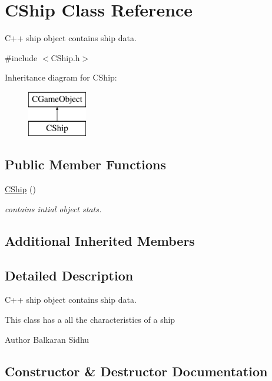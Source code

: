 \hypertarget{class_c_ship}{}\section{C\+Ship Class Reference}
\label{class_c_ship}


C++ ship object contains ship data.  




{\ttfamily \#include $<$C\+Ship.\+h$>$}

Inheritance diagram for C\+Ship\+:\begin{figure}[H]
\begin{center}
\leavevmode
\includegraphics[height=2.000000cm]{class_c_ship}
\end{center}
\end{figure}
\subsection*{Public Member Functions}
\begin{DoxyCompactItemize}
\item 
\hyperlink{class_c_ship_ab360264b9bcbcd4b733a8b64cb8f7529}{C\+Ship} ()
\begin{DoxyCompactList}\small\item\em contains intial object stats. \end{DoxyCompactList}\end{DoxyCompactItemize}
\subsection*{Additional Inherited Members}


\subsection{Detailed Description}
C++ ship object contains ship data. 

This class has a all the characteristics of a ship

\begin{DoxyAuthor}{Author}
Balkaran Sidhu 
\end{DoxyAuthor}


\subsection{Constructor \& Destructor Documentation}
\hypertarget{class_c_ship_ab360264b9bcbcd4b733a8b64cb8f7529}{}\label{class_c_ship_ab360264b9bcbcd4b733a8b64cb8f7529} 
